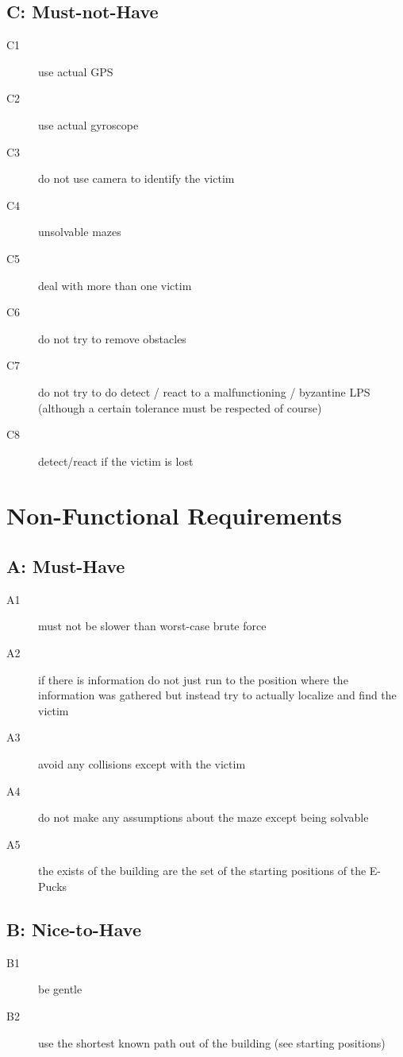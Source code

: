 \documentclass[a4paper,parskip,headheight=38pt]{scrartcl} %
\begin{document}
\subsection*{C: Must-not-Have}
\begin{description}
\item[C1] use actual GPS
\item[C2] use actual gyroscope
\item[C3] do not use camera to identify the victim
\item[C4] unsolvable mazes
\item[C5] deal with more than one victim
\item[C6] do not try to remove obstacles
\item[C7] do not try to do detect / react to a malfunctioning / byzantine LPS (although a certain tolerance must be respected of course)
\item[C8] detect/react if the victim is lost
\end{description}

\section{Non-Functional Requirements}
\subsection*{A: Must-Have}
\begin{description}
\item[A1] must not be slower than worst-case brute force
\item[A2] if there is information do not just run to the position where the information was gathered but instead try to actually localize and find the victim
\item[A3] avoid any collisions except with the victim
\item[A4] do not make any assumptions about the maze except being solvable
\item[A5] the exists of the building are the set of the starting positions of the E-Pucks
\end{description}

\subsection*{B: Nice-to-Have}
\begin{description}
\item[B1] be gentle
\item[B2] use the shortest known path out of the building (see starting positions)
\end{description}
\end{document}

